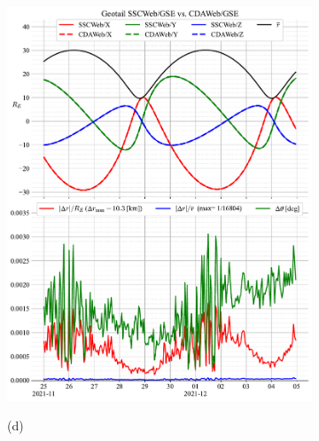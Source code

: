 \documentclass[draft]{agujournal2019}
\begin{document}
\begin{figure}[h]
\begin{subfigure}[b]{0.49\textwidth}
         \includegraphics[width=\textwidth]{figures/Geotail_SSCWeb-GSE_vs_CDAWeb-GSE.pdf}
     \end{subfigure}
     \begin{subfigure}[b]{0.49\textwidth}
         (d)
         \centering

\end{subfigure}
\end{figure}
\end{document}
